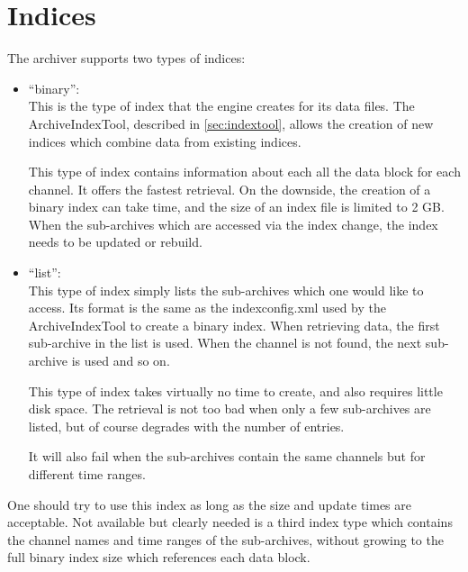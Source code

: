 \chapter{Indices} \label{chap:indices}
The archiver supports two types of indices:
\begin{itemize}
\item ``binary'':\\
      This is the type of index that the engine creates for its data
      files. The ArchiveIndexTool, described in \ref{sec:indextool},
      allows the creation of new indices which combine data from
      existing indices.

      This type of index contains information about each all the data
      block for each channel. It offers the fastest retrieval. On the
      downside, the creation of a binary index can take time, and the
      size of an index file is limited to 2 GB. When the sub-archives
      which are accessed via the index change, the index needs to be
      updated or rebuild.
\item ``list'':\\
      This type of index simply lists the sub-archives which one would
      like to access. Its format is the same as the indexconfig.xml
      used by the ArchiveIndexTool to create a binary index.
      When retrieving data, the first sub-archive in the list is
      used. When the channel is not found, the next sub-archive is
      used and so on.

      This type of index takes virtually no time to create, and also
      requires little disk space. The retrieval is not too bad when
      only a few sub-archives are listed, but of course degrades with
      the number of entries.

      It will also fail when the sub-archives contain the same
      channels but for different time ranges.
\end{itemize}

One should try to use this index as long as the size and update times
are acceptable.
Not available but clearly needed is a third index type which contains
the channel names and time ranges of the sub-archives, without growing
to the full binary index size which references each data block.

